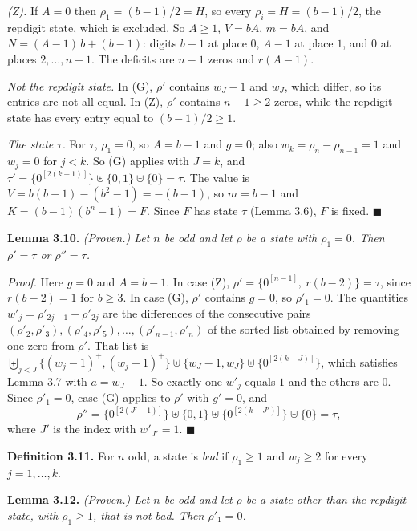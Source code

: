 \documentclass[11pt,letterpaper]{article}
\theoremstyle{paperstyle}
\theoremstyle{paperstyledef}
\theoremstyle{paperstylerem}
\begin{document}
\emph{(Z).} If \(A = 0\) then \(\rho_1 = (b-1)/2 = H\), so every \(\rho_i = H = (b-1)/2\), the repdigit state, which is excluded. So \(A \geq 1\), \(V = bA\), \(m = bA\), and \(N = (A-1)\,b + (b-1)\): digits \(b-1\) at place \(0\), \(A - 1\) at place \(1\), and \(0\) at places \(2, \dots, n-1\). The deficits are \(n - 1\) zeros and \(r(A-1)\).

\emph{Not the repdigit state.} In (G), \(\rho'\) contains \(w_J - 1\) and \(w_J\), which differ, so its entries are not all equal. In (Z), \(\rho'\) contains \(n - 1 \geq 2\) zeros, while the repdigit state has every entry equal to \((b-1)/2 \geq 1\).

\emph{The state \(\tau\).} For \(\tau\), \(\rho_1 = 0\), so \(A = b-1\) and \(g = 0\); also \(w_k = \rho_n - \rho_{n-1} = 1\) and \(w_j = 0\) for \(j < k\). So (G) applies with \(J = k\), and \(\tau' = \{0^{[2(k-1)]}\} \uplus \{0, 1\} \uplus \{0\} = \tau\). The value is \(V = b(b-1) - (b^2 - 1) = -(b-1)\), so \(m = b - 1\) and \(K = (b-1)(b^n - 1) = F\). Since \(F\) has state \(\tau\) (Lemma 3.6), \(F\) is fixed. \(\blacksquare\)

\textbf{Lemma 3.10.} \emph{(Proven.) Let \(n\) be odd and let \(\rho\) be a state with \(\rho_1 = 0\). Then \(\rho' = \tau\) or \(\rho'' = \tau\).}

\emph{Proof.} Here \(g = 0\) and \(A = b - 1\). In case (Z), \(\rho' = \{0^{[n-1]},\ r(b-2)\} = \tau\), since \(r(b-2) = 1\) for \(b \geq 3\). In case (G), \(\rho'\) contains \(g = 0\), so \(\rho'_1 = 0\). The quantities \(w'_j = \rho'_{2j+1} - \rho'_{2j}\) are the differences of the consecutive pairs \((\rho'_2, \rho'_3), (\rho'_4, \rho'_5), \dots, (\rho'_{n-1}, \rho'_n)\) of the sorted list obtained by removing one zero from \(\rho'\). That list is \(\biguplus_{j<J}\{(w_j-1)^+, (w_j-1)^+\} \uplus \{w_J - 1, w_J\} \uplus \{0^{[2(k-J)]}\}\), which satisfies Lemma 3.7 with \(a = w_J - 1\). So exactly one \(w'_j\) equals \(1\) and the others are \(0\). Since \(\rho'_1 = 0\), case (G) applies to \(\rho'\) with \(g' = 0\), and \[\rho'' = \{0^{[2(J'-1)]}\} \uplus \{0, 1\} \uplus \{0^{[2(k-J')]}\} \uplus \{0\} = \tau,\] where \(J'\) is the index with \(w'_{J'} = 1\). \(\blacksquare\)

\textbf{Definition 3.11.} For \(n\) odd, a state is \emph{bad} if \(\rho_1 \geq 1\) and \(w_j \geq 2\) for every \(j = 1, \dots, k\).

\textbf{Lemma 3.12.} \emph{(Proven.) Let \(n\) be odd and let \(\rho\) be a state other than the repdigit state, with \(\rho_1 \geq 1\), that is not bad. Then \(\rho'_1 = 0\).}
\end{document}
